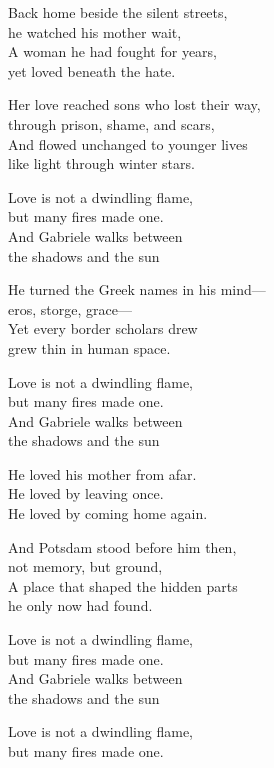 \begin{lyrics}

Back home beside the silent streets,\\
he watched his mother wait,\\
A woman he had fought for years,\\
yet loved beneath the hate.

Her love reached sons who lost their way,\\
through prison, shame, and scars,\\
And flowed unchanged to younger lives\\
like light through winter stars.

Love is not a dwindling flame,\\
but many fires made one.\\
And Gabriele walks between\\
the shadows and the sun

He turned the Greek names in his mind—\\
eros, storge, grace—\\
Yet every border scholars drew\\
grew thin in human space.

Love is not a dwindling flame,\\
but many fires made one.\\
And Gabriele walks between\\
the shadows and the sun

He loved his mother from afar.\\
He loved by leaving once.\\
He loved by coming home again.

And Potsdam stood before him then,\\
not memory, but ground,\\
A place that shaped the hidden parts\\
he only now had found.

Love is not a dwindling flame,\\
but many fires made one.\\
And Gabriele walks between\\
the shadows and the sun


Love is not a dwindling flame,\\
but many fires made one.


\end{lyrics}

